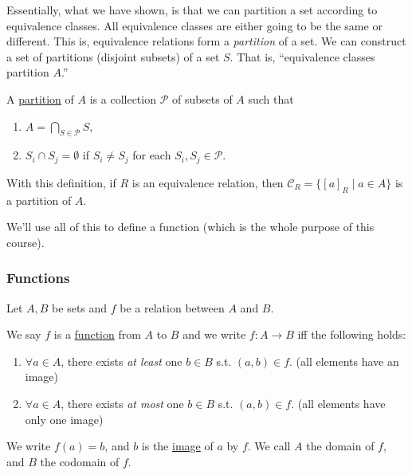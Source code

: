 Essentially, what we have shown, is that we can partition a set according to equivalence classes. All equivalence classes are either going to be the same or different. This is, equivalence relations form a \emph{partition} of a set. We can construct a set of partitions (disjoint subsets) of a set $S$. That is, ``equivalence classes partition $A$.''

\begin{definition}[Partition]
    A \ul{partition} of $A$ is a collection $\mathcal{P}$ of subsets of $A$ such that
    \begin{enumerate}
        \item $A = \bigcap_{S\in \mathcal{P}}S$,
        \item $S_i\cap S_j = \emptyset$ if $S_i\neq S_j$ for each $S_i, S_j\in \mathcal{P}$.
    \end{enumerate}
\end{definition}

With this definition, if $R$ is an equivalence relation, then $\mathcal{C}_R = \{[a]_R\mid a\in A\}$ is a partition of $A$.

We'll use all of this to define a function (which is the whole purpose of this course).

\subsubsection{Functions}
\begin{definition}[Function]
    Let $A, B$ be sets and $f$ be a relation between $A$ and $B$.

    We say $f$ is a \ul{function} from $A$ to $B$ and we write $f: A\to B$ iff the following holds:
    \begin{enumerate}
        \item $\forall a\in A$, there exists \emph{at least} one $b\in B$ s.t. $(a, b)\in f$. (all elements have an image)
        \item $\forall a\in A$, there exists \emph{at most} one $b\in B$ s.t. $(a, b)\in f$. (all elements have only one image)
    \end{enumerate}
    We write $f(a) = b$, and $b$ is the \ul{image} of $a$ by $f$. We call $A$ the domain of $f$, and $B$ the codomain of $f$.
\end{definition}